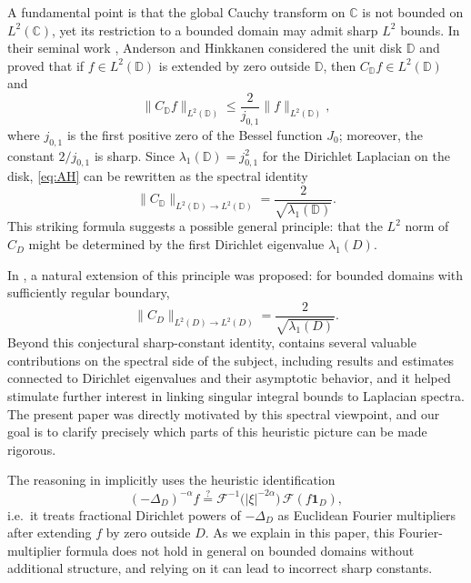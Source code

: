 \documentclass{amsart}
\newcommand{\C}{\mathbb{C}}
\theoremstyle{plain}
\theoremstyle{remark}
\begin{document}
A fundamental point is that the global Cauchy transform on $\C$ is not bounded on
$L^2(\C)$, yet its restriction to a bounded domain may admit sharp $L^2$ bounds.
In their seminal work \cite{AndersonHinkkanen1989}, Anderson and Hinkkanen
considered the unit disk $\mathbb{D}$ and proved that if $f\in L^2(\mathbb{D})$ is
extended by zero outside $\mathbb{D}$, then $C_\mathbb{D} f\in L^2(\mathbb{D})$ and
\begin{equation}\label{eq:AH}
\|C_\mathbb{D} f\|_{L^2(\mathbb{D})}\le \frac{2}{j_{0,1}}\|f\|_{L^2(\mathbb{D})},
\end{equation}
where $j_{0,1}$ is the first positive zero of the Bessel function $J_0$; moreover,
the constant $2/j_{0,1}$ is sharp. Since $\lambda_1(\mathbb{D})=j_{0,1}^2$ for the
Dirichlet Laplacian on the disk, \eqref{eq:AH} can be rewritten as the spectral
identity
\[
\|C_\mathbb{D}\|_{L^2(\mathbb{D})\to L^2(\mathbb{D})}=\frac{2}{\sqrt{\lambda_1(\mathbb{D})}}.
\]
This striking formula suggests a possible general principle: that the $L^2$ norm
of $C_D$ might be determined by the first Dirichlet eigenvalue $\lambda_1(D)$.

In \cite{Dostanic1996}, a natural extension of this principle was proposed: for
bounded domains with sufficiently regular boundary,
\begin{equation}\label{eq:dost-claim-intro}
\|C_D\|_{L^2(D)\to L^2(D)}=\frac{2}{\sqrt{\lambda_1(D)}}.
\end{equation}
Beyond this conjectural sharp-constant identity, \cite{Dostanic1996} contains
several valuable contributions on the spectral side of the subject, including
results and estimates connected to Dirichlet eigenvalues and their asymptotic
behavior, and it helped stimulate further interest in linking singular integral
bounds to Laplacian spectra. The present paper was directly motivated by this
spectral viewpoint, and our goal is to clarify precisely which parts of this
heuristic picture can be made rigorous.

The reasoning in \cite{Dostanic1996} implicitly uses the heuristic identification
\[
(-\Delta_D)^{-\alpha} f \stackrel{?}{=} \mathcal{F}^{-1}\!\big(|\xi|^{-2\alpha}\big)\,\mathcal{F}(f\mathbf{1}_D),
\]
i.e.\ it treats fractional Dirichlet powers of $-\Delta_D$ as Euclidean Fourier
multipliers after extending $f$ by zero outside $D$. As we explain in this paper,
this Fourier-multiplier formula does not hold in general on bounded domains
without additional structure, and relying on it can lead to incorrect sharp
constants.
\end{document}
